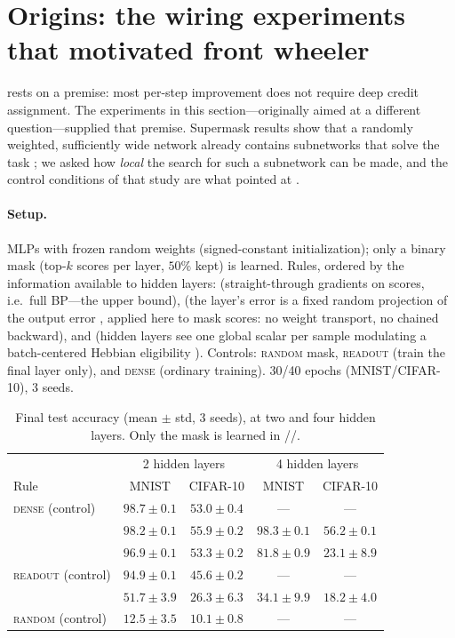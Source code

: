 \section{Origins: the wiring experiments that motivated front wheeler}
\label{sec:exp1}

\fw{} rests on a premise: most per-step improvement does not require deep
credit assignment. The experiments in this section---originally aimed at a
different question---supplied that premise. Supermask results show that a
randomly weighted, sufficiently wide network already contains subnetworks
that solve the task \citep{ramanujan2020whats, zhou2019deconstructing,
malach2020proving}; we asked how \emph{local} the search for such a
subnetwork can be made, and the control conditions of that study are what
pointed at \fw{}.

\paragraph{Setup.} MLPs with frozen random weights (signed-constant
initialization); only a binary mask (top-$k$ scores per layer, $50\%$ kept)
is learned. Rules, ordered by the information available to hidden layers:
\ep{} (straight-through gradients on scores, i.e.\ full BP---the upper
bound), \dfa{} (the layer's error is a fixed random projection of the output
error \citep{nokland2016direct}, applied here to mask scores: no weight
transport, no chained backward), and \rmhebb{} (hidden layers see one global
scalar per sample modulating a batch-centered Hebbian eligibility
\citep{fremaux2016neuromodulated, williams1992simple}). Controls:
\textsc{random} mask, \textsc{readout} (train the final layer only), and
\textsc{dense} (ordinary training). 30/40 epochs (MNIST/CIFAR-10), 3 seeds.

\begin{table}[t]
\centering
\caption{Final test accuracy (mean $\pm$ std, 3 seeds), at two and four
hidden layers. Only the mask is learned in \ep{}/\dfa{}/\rmhebb{}.}
\label{tab:exp1}
\begin{tabular}{lcccc}
\toprule
& \multicolumn{2}{c}{2 hidden layers} & \multicolumn{2}{c}{4 hidden layers} \\
Rule & MNIST & CIFAR-10 & MNIST & CIFAR-10 \\
\midrule
\textsc{dense} (control) & $98.7 \pm 0.1$ & $53.0 \pm 0.4$ & --- & --- \\
\ep{} & $98.2 \pm 0.1$ & $\mathbf{55.9 \pm 0.2}$ & $98.3 \pm 0.1$ & $\mathbf{56.2 \pm 0.1}$ \\
\dfa{} & $96.9 \pm 0.1$ & $53.3 \pm 0.2$ & $81.8 \pm 0.9$ & $23.1 \pm 8.9$ \\
\textsc{readout} (control) & $94.9 \pm 0.1$ & $45.6 \pm 0.2$ & --- & --- \\
\rmhebb{} & $51.7 \pm 3.9$ & $26.3 \pm 6.3$ & $34.1 \pm 9.9$ & $18.2 \pm 4.0$ \\
\textsc{random} (control) & $12.5 \pm 3.5$ & $10.1 \pm 0.8$ & --- & --- \\
\bottomrule
\end{tabular}
\end{table}

